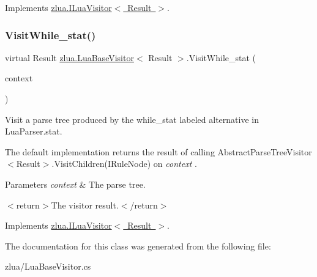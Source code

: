 Implements \mbox{\hyperlink{interfacezlua_1_1_i_lua_visitor_ae2449e1f9969f993c00cea039da1d48e}{zlua.\+I\+Lua\+Visitor$<$ Result $>$}}.

\mbox{\label{classzlua_1_1_lua_base_visitor_af5b6f400f4f8c7b55507a798e2abef27}} 
\subsubsection{\texorpdfstring{Visit\+While\+\_\+stat()}{VisitWhile\_stat()}}
{\footnotesize\ttfamily virtual Result \mbox{\hyperlink{classzlua_1_1_lua_base_visitor}{zlua.\+Lua\+Base\+Visitor}}$<$ Result $>$.Visit\+While\+\_\+stat (\begin{DoxyParamCaption}\item[{\mbox{[}\+Not\+Null\mbox{]} \mbox{\hyperlink{classzlua_1_1_lua_parser_1_1_while__stat_context}{Lua\+Parser.\+While\+\_\+stat\+Context}}}]{context }\end{DoxyParamCaption})\hspace{0.3cm}{\ttfamily [virtual]}}



Visit a parse tree produced by the {\ttfamily while\+\_\+stat} labeled alternative in Lua\+Parser.\+stat. 

The default implementation returns the result of calling Abstract\+Parse\+Tree\+Visitor$<$\+Result$>$.\+Visit\+Children(\+I\+Rule\+Node) on {\itshape context} . 


\begin{DoxyParams}{Parameters}
{\em context} & The parse tree.\\
\hline
\end{DoxyParams}
$<$return$>$The visitor result.$<$/return$>$ 

Implements \mbox{\hyperlink{interfacezlua_1_1_i_lua_visitor_a89838dbcf062f4b3adaf75df89febc8d}{zlua.\+I\+Lua\+Visitor$<$ Result $>$}}.



The documentation for this class was generated from the following file\+:\begin{DoxyCompactItemize}
\item 
zlua/Lua\+Base\+Visitor.\+cs\end{DoxyCompactItemize}
